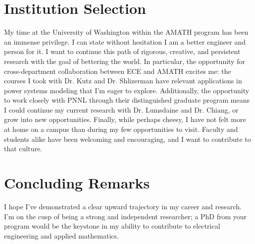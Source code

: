 \documentclass[letterpaper]{article}
\begin{document}
\section*{Institution Selection}
My time at the University of Washington within the AMATH program has been an immense privilege. I
can state without hesitation I am a better engineer and person for it. I want to continue this path
of rigorous, creative, and persistent research with the goal of bettering the world. In particular,
the opportunity for cross-department collaboration between ECE and AMATH excites me: the courses I
took with Dr. Kutz and Dr. Shlizerman have relevant applications in power systems modeling that I'm
eager to explore. Additionally, the opportunity to work closely with PNNL through their
distinguished graduate program means I could continue my current research with Dr. Lumsdaine
and Dr. Chiang, or grow into new opportunities. Finally, while perhaps cheesy, I have not
felt more at home on a campus than during my few opportunities to visit. Faculty and students alike
have been welcoming and encouraging, and I want to contribute to that culture.

\section*{Concluding Remarks}
I hope I've demonstrated a clear upward trajectory in my career and research.
I'm on the cusp of being a strong and independent researcher; a PhD from your program
would be the keystone in my ability to contribute to electrical engineering and applied
mathematics.
\end{document}
